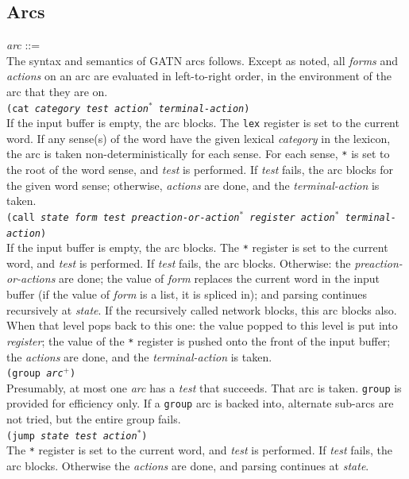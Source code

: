 \documentclass{book}
\begin{document}
\subsection{Arcs}
{\it arc} ::= \\
The syntax and semantics of GATN arcs follows.  Except as noted,
all {\it forms} and {\it actions} on an arc are evaluated in
left-to-right order, in the environment of the arc that they are
on.\\[2ex]
{\tt (cat {\it category test action$^*$ terminal-action})} \\
If the input buffer is empty, the arc blocks.  The {\tt lex} register is set to the current word.  If any
sense(s) of the word have the given lexical {\it category} in the lexicon, the arc is taken
non-deterministically for each sense.  For each sense, \verb|*| is set to the root of the word sense, and
{\it test} is performed.  If {\it test} fails, the arc blocks for the given word sense; otherwise, {\it
actions} are done, and the {\it terminal-action} is taken.  \\[2ex]
{\tt (call {\it state form test preaction-or-action$^*$ register action$^*$ terminal-action})} \\
If the input buffer is empty, the arc blocks.  The \verb|*| register is set to the current word, and {\it
test} is performed.  If {\it test} fails, the arc blocks.  Otherwise: the {\it preaction-or-actions} are
done; the value of {\it form} replaces the current word in the input buffer (if the value of {\it form} is a
list, it is spliced in); and parsing continues recursively at {\it state}.  If the recursively called network
blocks, this arc blocks also.  When that level pops back to this one: the value popped to this level is put
into {\it register}; the value of the \verb|*| register is pushed onto the front of the input buffer; the
{\it actions} are done, and the {\it terminal-action} is taken.  \\[2ex]
{\tt (group {\it arc$^+$})} \\
Presumably, at most one {\it arc} has a {\it test} that succeeds.
That arc is taken.  {\tt group} is provided for efficiency only.  If a {\tt group} arc is backed
into, alternate sub-arcs are not tried, but the entire group fails. \\[2ex]
{\tt (jump {\it state test action$^*$})} \\
The \verb|*| register is set to the current word, and {\it test} is performed.  If {\it test} fails, the arc
blocks.  Otherwise the {\it actions} are done, and parsing continues at {\it state}.  \\[2ex]
\end{document}
